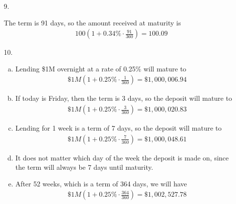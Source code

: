 \documentclass{article}
\begin{document}
\begin{enumerate}
	\item[9.]
		\begin{soln}
			The term is 91 days, so the amount received at maturity is
			\begin{align*}
				100\left( 1+0.34\%\cdot \frac{91}{360} \right) = 100.09
			\end{align*}
		\end{soln}

	\item[10.]
		\begin{enumerate}[(a)]
			\item 
				\begin{soln}
					Lending \$1M overnight at a rate of 0.25\% will mature to
					\begin{align*}
						\$1M\left( 1+0.25\%\cdot \frac{1}{360} \right) = \$1, 000, 006.94
					\end{align*}
				\end{soln}

			\item 
				\begin{soln}
					If today is Friday, then the term is 3 days, so the deposit will mature to
					\begin{align*}
						\$1M\left( 1+0.25\%\cdot \frac{3}{360} \right) = \$1, 000, 020.83
					\end{align*}
				\end{soln}

			\item
				\begin{soln}
					Lending for 1 week is a term of 7 days, so the deposit will mature to
					\begin{align*}
						\$1M\left( 1+0.25\%\cdot \frac{7}{360} \right) = \$1, 000, 048.61
					\end{align*}
				\end{soln}

			\item 
				\begin{soln}
					It does not matter which day of the week the deposit is made on, since the term will always be 7 days until maturity.
				\end{soln}

			\item 
				\begin{soln}
					After 52 weeks, which is a term of 364 days, we will have
					\begin{align*}
						\$1M\left( 1+0.25\%\cdot \frac{364}{360} \right) = \$1, 002, 527.78
					\end{align*}
				\end{soln}


\end{enumerate}
\end{enumerate}
\end{document}
